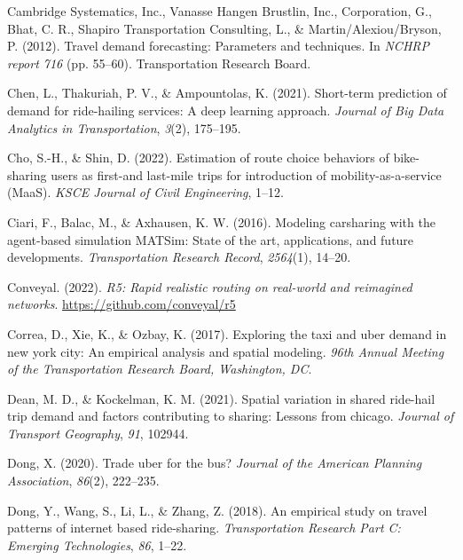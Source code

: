 \documentclass[fancy, masters]{byuthesis}
\newlength{\cslhangindent}
\newlength{\cslentryspacingunit} %
\newenvironment{CSLReferences}[2] %
 {%
  \setlength{\parindent}{0pt}
  \ifodd #1
  \let\oldpar\par
  \def\par{\hangindent=\cslhangindent\oldpar}
  \fi
  \setlength{\parskip}{#2\cslentryspacingunit}
 }%
 {}
\begin{document}
\begin{CSLReferences}{1}{0}
\leavevmode{}%
Cambridge Systematics, Inc., Vanasse Hangen Brustlin, Inc., Corporation, G., Bhat, C. R., Shapiro Transportation Consulting, L., \& Martin/Alexiou/Bryson, P. (2012). Travel demand forecasting: Parameters and techniques. In \emph{NCHRP report 716} (pp. 55--60). Transportation Research Board.

\leavevmode{}%
Chen, L., Thakuriah, P. V., \& Ampountolas, K. (2021). Short-term prediction of demand for ride-hailing services: A deep learning approach. \emph{Journal of Big Data Analytics in Transportation}, \emph{3}(2), 175--195.

\leavevmode{}%
Cho, S.-H., \& Shin, D. (2022). Estimation of route choice behaviors of bike-sharing users as first-and last-mile trips for introduction of mobility-as-a-service (MaaS). \emph{KSCE Journal of Civil Engineering}, 1--12.

\leavevmode{}%
Ciari, F., Balac, M., \& Axhausen, K. W. (2016). Modeling carsharing with the agent-based simulation MATSim: State of the art, applications, and future developments. \emph{Transportation Research Record}, \emph{2564}(1), 14--20.

\leavevmode{}%
Conveyal. (2022). \emph{R5: Rapid realistic routing on real-world and reimagined networks}. \url{https://github.com/conveyal/r5}

\leavevmode{}%
Correa, D., Xie, K., \& Ozbay, K. (2017). Exploring the taxi and uber demand in new york city: An empirical analysis and spatial modeling. \emph{96th Annual Meeting of the Transportation Research Board, Washington, DC}.

\leavevmode{}%
Dean, M. D., \& Kockelman, K. M. (2021). Spatial variation in shared ride-hail trip demand and factors contributing to sharing: Lessons from chicago. \emph{Journal of Transport Geography}, \emph{91}, 102944.

\leavevmode{}%
Dong, X. (2020). Trade uber for the bus? \emph{Journal of the American Planning Association}, \emph{86}(2), 222--235.

\leavevmode{}%
Dong, Y., Wang, S., Li, L., \& Zhang, Z. (2018). An empirical study on travel patterns of internet based ride-sharing. \emph{Transportation Research Part C: Emerging Technologies}, \emph{86}, 1--22.


\end{CSLReferences}
\end{document}
